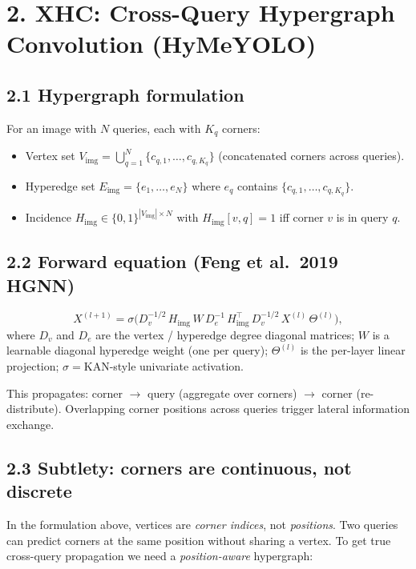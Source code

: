 \documentclass[10pt]{article}
\begin{document}
\section*{2. XHC: Cross-Query Hypergraph Convolution (HyMeYOLO)}

\subsection*{2.1 Hypergraph formulation}

For an image with $N$ queries, each with $K_q$ corners:
\begin{itemize}
  \item Vertex set $V_{\text{img}} = \bigcup_{q=1}^N \{c_{q,1}, \ldots, c_{q,K_q}\}$
    (concatenated corners across queries).
  \item Hyperedge set $E_{\text{img}} = \{e_1, \ldots, e_N\}$ where
    $e_q$ contains $\{c_{q,1}, \ldots, c_{q,K_q}\}$.
  \item Incidence $H_{\text{img}} \in \{0, 1\}^{|V_{\text{img}}| \times N}$ with
    $H_{\text{img}}[v, q] = 1$ iff corner $v$ is in query $q$.
\end{itemize}

\subsection*{2.2 Forward equation (Feng et al.\ 2019 HGNN)}

\[
  X^{(l+1)} = \sigma\big(
    D_v^{-1/2} \, H_{\text{img}} \, W \, D_e^{-1} \, H_{\text{img}}^\top
    \, D_v^{-1/2} \, X^{(l)} \, \Theta^{(l)}
  \big),
\]
where $D_v$ and $D_e$ are the vertex / hyperedge degree diagonal
matrices; $W$ is a learnable diagonal hyperedge weight (one per
query); $\Theta^{(l)}$ is the per-layer linear projection;
$\sigma = \mathrm{KAN}$-style univariate activation.

This propagates: corner $\to$ query (aggregate over corners)
$\to$ corner (re-distribute). Overlapping corner positions across
queries trigger lateral information exchange.

\subsection*{2.3 Subtlety: corners are continuous, not discrete}

In the formulation above, vertices are \emph{corner indices}, not
\emph{positions}. Two queries can predict corners at the same
position without sharing a vertex. To get true cross-query
propagation we need a \emph{position-aware} hypergraph:
\end{document}
